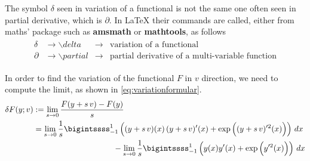 \documentclass[12pt]{article}
\begin{document}
\begin{interestingfactboxed}
	The symbol $\delta$ seen in variation of a functional
	is not the same one often seen in 
	partial derivative, which is $\partial$. 
	In \mbox{\LaTeX} their commands are called,
	either from maths' package such as 
	\textbf{amsmath} or \textbf{mathtools}, 
	as follows
	\begin{align}
		\begin{array}{clll}
			\delta   & \rightarrow \backslash delta   & \rightarrow & \text{variation of a functional}                       \\
			\partial & \rightarrow \backslash partial & \rightarrow & \text{partial derivative of a multi-variable function}
		\end{array}
	\end{align}
\end{interestingfactboxed}
\newpage
In order to find the variation of the functional $F$
in $v$ direction, we need to compute the limit,
as shown in \eqref{eq:variationformular}.
\begin{align}
	\delta F(y;v)
	 & :=  \lim_{s\to 0}\frac{F(y+s\,v)-F(y)}{s} \notag \\
	 & =  \lim_{s\to 0} \frac{1}{s}
	\bigintssss_{-1}^{1}
	\left(
	(y+s\,v)(x) \,
	(y+s\,v)^\prime(x)
	+ \exp{\Big((y+s\,v)^{\prime 2}(x)\Big)}
	\right)\,dx
	\label{eq:first1}                                   \\
	 & \qquad\qquad\qquad\qquad\qquad
	-\lim_{s\to 0} \frac{1}{s}
	\bigintssss_{-1}^{1}
	\left(
	y(x)y'(x) + \exp{\Big( y^{\prime 2}(x) \Big)}
	\right)\,dx                            
	\label{eq:first2}
\end{align}
\end{document}
